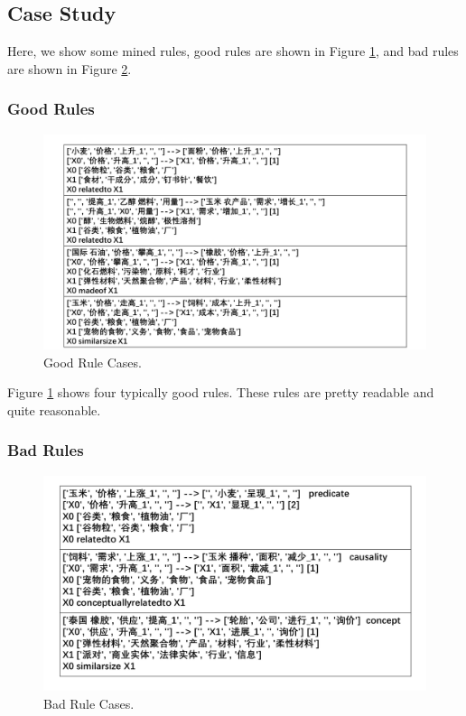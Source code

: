 

\subsection{Case Study}
Here, we show some mined rules, good rules are shown in Figure \ref{fig:good_rule_case}, and bad rules are shown in Figure \ref{fig:bad_rule_case}. 
\subsubsection{Good Rules}
\begin{figure}[htbp]
	\centerline{\includegraphics[width=0.9\columnwidth]{figures/good_rule_case}}
	\caption{Good Rule Cases.}
	\label{fig:good_rule_case}
\end{figure}	

Figure \ref{fig:good_rule_case} shows four typically good rules. These rules are pretty readable and quite reasonable.


\subsubsection{Bad Rules}
\begin{figure}[htbp]
	\centerline{\includegraphics[width=0.9\columnwidth]{figures/bad_rule_case}}
	\caption{Bad Rule Cases.}
	\label{fig:bad_rule_case}
\end{figure}


